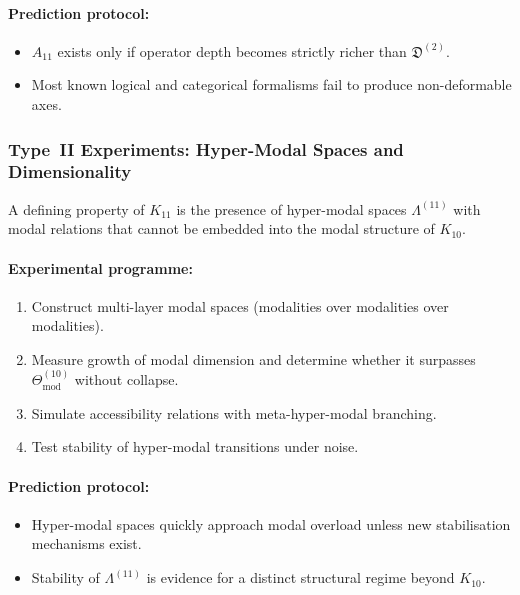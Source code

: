 \paragraph{Prediction protocol:}

\begin{itemize}
    \item $A_{11}$ exists only if operator depth becomes strictly
          richer than $\mathfrak{D}^{(2)}$.
    \item Most known logical and categorical formalisms fail to
          produce non-deformable axes.
\end{itemize}



\subsubsection{Type~II Experiments: Hyper-Modal Spaces and Dimensionality}

A defining property of $K_{11}$ is the presence of
hyper-modal spaces $\Lambda^{(11)}$ with modal relations that cannot
be embedded into the modal structure of $K_{10}$.

\paragraph{Experimental programme:}

\begin{enumerate}
    \item Construct multi-layer modal spaces
          (modalities over modalities over modalities).
    \item Measure growth of modal dimension and
          determine whether it surpasses
          $\Theta_{\mathrm{mod}}^{(10)}$ without collapse.
    \item Simulate accessibility relations with
          meta-hyper-modal branching.
    \item Test stability of hyper-modal transitions under noise.
\end{enumerate}

\paragraph{Prediction protocol:}

\begin{itemize}
    \item Hyper-modal spaces quickly approach modal overload unless
          new stabilisation mechanisms exist.
    \item Stability of $\Lambda^{(11)}$ is evidence for a
          distinct structural regime beyond $K_{10}$.
\end{itemize}



